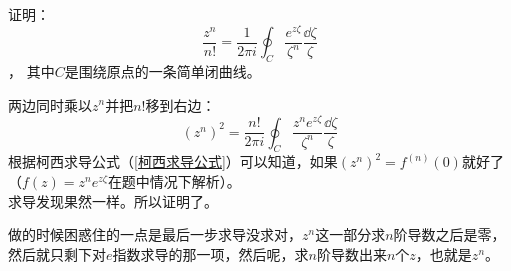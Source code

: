 \documentclass[cn,hazy,blue,14pt,normal]{elegantnote}
\numberwithin{equation}{section}
\begin{document}
\begin{example}
	证明：
	$$ \frac{z^n}{n!} = \frac{1}{2\pi i}\oint_C \frac{e^{z\zeta}}{\zeta^n}\frac{\dd \zeta}{\zeta} $$，
	其中$C$是围绕原点的一条简单闭曲线。
\end{example}
两边同时乘以$z^n$并把$n!$移到右边：
$$ \left(z^n\right)^2 = \frac{n!}{2\pi i}\oint_C \frac{z^n e^{ z\zeta}}{\zeta^n}\frac{\dd \zeta}{\zeta} $$
根据柯西求导公式（\ref{柯西求导公式}）可以知道，如果$\left(z^n\right)^2 = f^{(n)}(0)$就好了（$ f(z) = z^n e^{ z\zeta} $在题中情况下解析）。\\
求导发现果然一样。所以证明了。
\begin{note}
	做的时候困惑住的一点是最后一步求导没求对，$z^n$这一部分求$n$阶导数之后是零，然后就只剩下对$e$指数求导的那一项，然后呢，求$n$阶导数出来$n$个$z$，也就是$z^n$。
\end{note}
\end{document}
